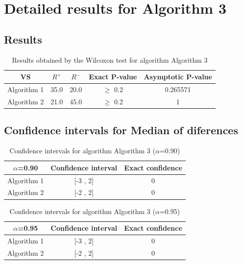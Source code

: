 \documentclass[a4paper,10pt]{article}
\begin{document}
 \clearpage 


\section{Detailed results for Algorithm 3}


\subsection{Results}

\begin{table}[!htp]
\centering\small
\begin{tabular}{
|c|c|c|c|c|}
\hline
 VS & $R^{+}$ & $R^{-}$ & Exact P-value & Asymptotic P-value \\ \hline 
Algorithm 1 & 35.0 & 20.0 & $\geq$ 0.2 & 0.265571\\ \hline 
Algorithm 2 & 21.0 & 45.0 & $\geq$ 0.2 & 1\\ \hline 

\end{tabular}
\caption{Results obtained by the Wilcoxon test for algorithm Algorithm 3}
\end{table}

\subsection{Confidence intervals for Median of diferences}

\begin{table}[!htp]
\centering\small
\begin{tabular}{
|c|c|c|}
\hline
 $\alpha$=0.90 & Confidence interval & Exact confidence \\ \hline 
Algorithm 1 & [-3 , 2] & 0\\ \hline 
Algorithm 2 & [-2 , 2] & 0\\ \hline 

\end{tabular}
\caption{Confidence intervals for algorithm Algorithm 3 ($\alpha$=0.90)}
\end{table}
\begin{table}[!htp]
\centering\small
\begin{tabular}{
|c|c|c|}
\hline
 $\alpha$=0.95 & Confidence interval & Exact confidence \\ \hline 
Algorithm 1 & [-3 , 2] & 0\\ \hline 
Algorithm 2 & [-2 , 2] & 0\\ \hline 

\end{tabular}
\caption{Confidence intervals for algorithm Algorithm 3 ($\alpha$=0.95)}
\end{table}

 \clearpage 
\end{document}
